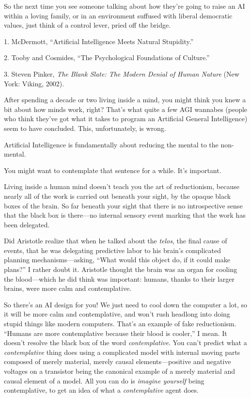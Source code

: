 {
 So the next time you see someone talking about how
they're going to raise an AI within a loving family, or
in an environment suffused with liberal democratic values, just think
of a control lever, pried off the bridge.}

\myendsectiontext


\bigskip

{
 1. McDermott, ``Artificial Intelligence Meets
Natural Stupidity.''}

{
 2. Tooby and Cosmides, ``The Psychological
Foundations of Culture.''}

{
 3. Steven Pinker, \textit{The Blank Slate: The Modern Denial of
Human Nature} (New York: Viking, 2002).}


{
 After spending a decade or two living inside a mind, you might
think you knew a bit about how minds work, right?
That's what quite a few AGI wannabes (people who think
they've got what it takes to program an Artificial
General Intelligence) seem to have concluded. This, unfortunately, is
wrong. }

{
 Artificial Intelligence is fundamentally about reducing the mental
to the non-mental.}

{
 You might want to contemplate that sentence for a while.
It's important.}

{
 Living inside a human mind doesn't teach you the
art of reductionism, because nearly all of the work is carried out
beneath your sight, by the opaque black boxes of the brain. So far
beneath your sight that there is no introspective sense that the black
box is there---no internal sensory event marking that the work has been
delegated.}

{
 Did Aristotle realize that when he talked about the
\textit{telos}, the final cause of events, that he was delegating
predictive labor to his brain's complicated planning
mechanisms---asking, ``What would this object do, if
it could make plans?'' I rather doubt it. Aristotle
thought the brain was an organ for cooling the blood---which he did
think was important: humans, thanks to their larger brains, were more
calm and contemplative.}

{
 So there's an AI design for you! We just need to
cool down the computer a lot, so it will be more calm and
contemplative, and won't rush headlong into doing
stupid things like modern computers. That's an example
of fake reductionism. ``Humans are more contemplative
because their blood is cooler,'' I mean. It
doesn't resolve the black box of the word
\textit{contemplative}. You can't predict what a
\textit{contemplative} thing does using a complicated model with
internal moving parts composed of merely material, merely causal
elements---positive and negative voltages on a transistor being the
canonical example of a merely material and causal element of a model.
All you can do is \textit{imagine yourself} being contemplative, to get
an idea of what a \textit{contemplative} agent does.}

